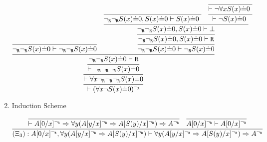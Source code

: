 \begin{enumerate}
    $$
    \infer{
        \vdash (\forall x \neg S(x)\dot{=}0)^{\neg_\R}
    }{
        \infer{
            \vdash \forall x \neg_\R\neg_\R\neg_\R S(x)\dot{=}0
        }{
            \infer{
                \vdash \neg_\R\neg_\R\neg_\R S(x)\dot{=}0
            }{
                \infer{
                    \neg_\R\neg_\R S(x)\dot{=}0 \vdash \R
                }{
                   \infer{
                        \neg_\R\neg_\R S(x)\dot{=}0 \vdash \neg_\R\neg_\R S(x)\dot{=}0
                    }{
                    }&
                   \infer{
                        \neg_\R\neg_\R S(x)\dot{=}0 \vdash \neg_\R S(x)\dot{=}0
                    }{
                        \infer{
                           \neg_\R\neg_\R S(x)\dot{=}0, S(x)\dot{=}0\vdash \R 
                        }{
                            \infer{
                                \neg_\R\neg_\R S(x)\dot{=}0, S(x)\dot{=}0\vdash \bottom 
                            }{
                                \infer{
                                    \neg_\R\neg_\R S(x)\dot{=}0, S(x)\dot{=}0\vdash S(x)\dot{=}0\ 
                                }{   
                                }&
                                \infer{
                                    \vdash \neg S(x)\dot{=}0\ 
                                }{
                                    \infer{
                                        \vdash \neg \forall xS(x)\dot{=}0\ 
                                    }{
                                    }
                                }
                            }
                        }
                    }
                }
            }
        }
    }
    $$
    
    \item Induction Scheme
    
    $$
    \infer{
        (\Xi_3) : A[0/x]^{\neg_\R}, \forall y(A[y/x]^{\neg_\R} \Rightarrow A[S(y)/x]^{\neg_\R}) \vdash \forall y(A[y/x]^{\neg_\R} \Rightarrow A[S(y)/x]^{\neg_\R}) \Rightarrow A^{\neg_\R}
    }{
        \infer{
            \vdash A[0/x]^{\neg_\R} \Rightarrow \forall y(A[y/x]^{\neg_\R} \Rightarrow A[S(y)/x]^{\neg_\R}) \Rightarrow A^{\neg_\R}
        }{
        }&
        \infer{
            A[0/x]^{\neg_\R} \vdash A[0/x]^{\neg_\R}
        }{
        }
    }
    $$
    

\end{enumerate}
